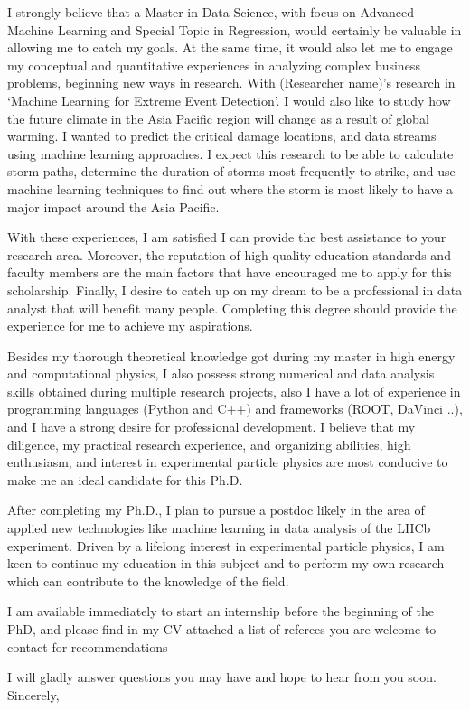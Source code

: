 \begin{cvletter}
I strongly believe that a Master in Data Science, with focus on Advanced Machine Learning and Special Topic in Regression, would certainly be valuable in allowing me to catch my goals. At the same time, it would also let me to engage my conceptual and quantitative experiences in analyzing complex business problems, beginning new ways in research. With (Researcher name)'s research in ‘Machine Learning for Extreme Event Detection’. I would also like to study how the future climate in the Asia Pacific region will change as a result of global warming. I wanted to predict the critical damage locations, and data streams using machine learning approaches. I expect this research to be able to calculate storm paths, determine the duration of storms most frequently to strike, and use machine learning techniques to find out where the storm is most likely to have a major impact around the Asia Pacific.

With these experiences, I am satisfied I can provide the best assistance to your research area. Moreover, the reputation of high-quality education standards and faculty members are the main factors that have encouraged me to apply for this scholarship. Finally, I desire to catch up on my dream to be a professional in data analyst that will benefit many people. Completing this degree should provide the experience for me to achieve my aspirations.



Besides my thorough theoretical knowledge got during my master in high energy and computational physics, I also possess strong numerical and data analysis skills obtained during multiple research projects, also I have a lot of experience in programming languages (Python and C++) and frameworks (ROOT, DaVinci ..), and I have a strong desire for professional development. I believe that my diligence, my practical research experience, and organizing abilities, high enthusiasm, and interest in experimental particle physics are most conducive to make me an ideal candidate for this Ph.D.

After completing my Ph.D., I plan to pursue a postdoc likely in the area of applied new technologies like machine learning in data analysis of the LHCb experiment. Driven by a lifelong interest in experimental particle physics, I am keen to continue my education in this subject and to perform my own research which can contribute to the knowledge of the field.

I am available immediately to start an internship before the beginning of the PhD, and please find in my CV attached a list of referees you are welcome to contact for recommendations

I will gladly answer questions you may have and hope to hear from you soon. Sincerely,

\end{cvletter}


\makeletterclosing


